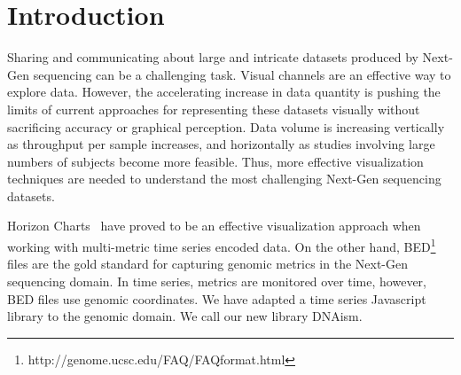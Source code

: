 \documentclass{bioinfo}
\begin{document}
\section{Introduction}

Sharing and communicating about large and intricate datasets produced by
Next-Gen sequencing can be a challenging task. Visual channels are an effective
way to explore data. However, the accelerating increase in data quantity is
pushing the limits of current approaches for representing these datasets
visually without sacrificing accuracy or graphical perception.  Data volume is
increasing vertically as throughput per sample increases, and horizontally as
studies involving large numbers of subjects become more feasible.  Thus, more
effective visualization techniques are needed to understand the most
challenging Next-Gen sequencing datasets.

Horizon Charts~\citep{time-in-the-horizon} have proved to be an effective
visualization approach when working with multi-metric time series encoded data.
On the other hand, BED\footnote{http://genome.ucsc.edu/FAQ/FAQformat.html}
files are the gold standard for capturing genomic metrics in the Next-Gen
sequencing domain. In time series, metrics are monitored over time, however,
BED files use genomic coordinates. We have adapted a time series Javascript
library to the genomic domain. We call our new library DNAism.
\end{document}
